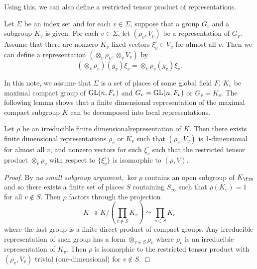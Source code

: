 Using this,  we can also define a restricted tensor product of representations. 

\begin{definition}
Let $\Sigma$ be an index set and for each $v\in \Sigma$, suppose that a group $G_{v}$ and a subgroup $K_{v}$ is given. 
For each $v\in \Sigma$, let $(\rho_{v}, V_{v})$ be a representation of $G_{v}$. 
Assume that there are nonzero $K_{v}$-fixed vectors $\xi_{v}^{\circ}\in V_{v}$ for almost all $v$.
Then we can define a representation $(\otimes_{v}\rho_{V}, \otimes_{v} V_{v})$ by 
$$
(\otimes_{v}\rho_{v})(g_{v})\xi_{v} = \otimes_{v}\rho_{v}(g_{v})\xi_{v}. 
$$
\end{definition}
In this note, we assume that $\Sigma$ is a set of places of some global field $F$, $K_{v}$ be maximal compact group of $\mathrm{GL}(n, F_{v})$ and $G_{v}= \mathrm{GL}(n, F_{v})$ or $G_{v} = K_{v}$. 
The following lemma shows that a finite dimensional representation of the maximal compact subgroup $K$ can be decomposed into local representations.
\begin{lemma}
\label{cptprod}
Let $\rho$ be an irreducible finite dimensionalrepresentation of $K$. Then there exists finite dimensional representations $\rho_{v}$ or $K_{v}$ such that $(\rho_{v}, V_{v})$ is 1-dimensional for almost all $v$, and nonzero vectors for such $\xi_{v}^{\circ}$ such that the restricted tensor product $\otimes_{v}\rho_{v}$ with respect to $\{\xi_{v}^{\circ}\}$ is isomorphic to $(\rho, V)$. 
\end{lemma}
\begin{proof}
By \emph{no small subgroup argument}, $\ker \rho$ contains an open subgroup of $K_{\fin}$ and so there exists a finite set of places $S$ containing $S_{\infty}$ such that $\rho(K_{v}) = 1$ for all $v\not\in S$. 
Then $\rho$ factors through the projection 
$$
K \twoheadrightarrow K / (\prod_{v\not\in S} K_{v}) \simeq \prod_{v\in S} K_{v}
$$
where the last group is a finite direct product of compact groups. 
Any irreducible representation of such group has a form $\otimes_{v\in S} \rho_{v}$ where $\rho_{v}$ is an irreducible representation of $K_{v}$. Then $\rho$ is isomorphic to the restricted tensor product with $(\rho_{v}, V_{v})$ trivial (one-dimensional) for $v\not\in S$.  
\end{proof}


\begin{comment}
\begin{definition}[Admissible representation of $\GL(n, \Aa)$]
A representation $(\pi, V)$ of $\GL(n, \Aa)$ is admissible if $V$ is both $(\frag_{\infty}, K_{\infty})$-module and $\GL(n, \Aa_{\fin})$-module with commuting actions, where every vector in $V$ is $K$-finite and $\rho$-isotypic part $V(\rho)$ of $V$ is finite dimensional for any irreducible finite dimensionalrepresentation of $K$. 
\end{definition}
Note that this is almost same as the local definitions that we defined in the previous chapters. 
\end{comment}


